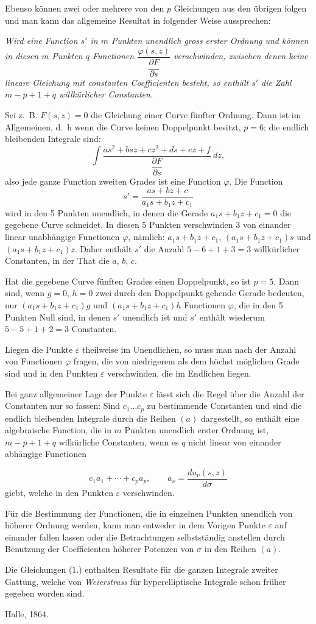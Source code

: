 \documentclass{article}
\begin{document}
Ebenso können zwei oder mehrere von den $p$ Gleichungen aus den übrigen folgen und man kann das allgemeine Resultat in folgender Weise aussprechen:

\emph{Wird eine Function $s'$ in $m$ Punkten unendlich gross erster Ordnung und können in diesen $m$ Punkten $q$ Functionen $\dfrac{\varphi(s, z)}{\dfrac{\partial F}{\partial s}}$ verschwinden, zwischen denen keine lineare Gleichung mit constanten Coefficienten besteht, so enthält $s'$ die Zahl $m-p+1+q$ willkürlicher Constanten.}

Sei z.~B. $F(s, z) = 0$ die Gleichung einer Curve fünfter Ordnung. Dann ist im Allgemeinen, d.~h wenn die Curve keinen Doppelpunkt besitzt, $p = 6$; die endlich bleibenden Integrale sind:
\[ \int \frac{as^{2} + bsz + cz^{2} + ds + ez + f}{\dfrac{\partial F}{\partial s}}\ dz, \]
also jede ganze Function zweiten Grades ist eine Function $\varphi$. Die Function
\[ s' = \frac{as + bz + c}{a_{1}s + b_{1}z + c_{1}} \]
wird in den 5 Punkten unendlich, in denen die Gerade $a_{1}s + b_{1}z + c_{1} = 0$ die gegebene Curve schneidet. In diesen 5 Punkten verschwinden 3 von einander linear unabhängige Functionen $\varphi$, nämlich: $a_{1}s + b_{1}z + c_{1}$, $(a_{1}s + b_{1}z + c_{1})s$ und $(a_{1}s + b_{1}z + c_{1})z$. Daher enthält $s'$ die Anzahl $5 - 6 + 1 + 3 = 3$ willkürlicher Constanten, in der That die $a$, $b$, $c$.

Hat die gegebene Curve fünften Grades einen Doppelpunkt, so ist $p = 5$. Dann sind, wenn $g = 0$, $h = 0$ zwei durch den Doppelpunkt gehende Gerade bedeuten, nur $(a_{1}s + b_{1}z + c_{1})g$ und $(a_{1}s + b_{1}z + c_{1})h$ Functionen $\varphi$, die in den 5 Punkten Null sind, in denen $s'$ unendlich ist und $s'$ enthält wiederum $5 - 5 + 1 + 2 = 3$ Constanten.

Liegen die Punkte $\varepsilon$ theilweise im Unendlichen, so muss man nach der Anzahl von Functionen $\varphi$ fragen, die von niedrigerem als dem höchst möglichen Grade sind und in den Punkten $\varepsilon$ verschwinden, die im Endlichen liegen.

Bei ganz allgemeiner Lage der Punkte $\varepsilon$ lässt sich die Regel über die Anzahl der Constanten nur so fassen: Sind $c_{1} \ldots c_{p}$ zu bestimmende Constanten und sind die endlich bleibenden Integrale durch die Reihen $(a)$ dargestellt, so enthält eine algebraische Function, die in $m$ Punkten unendlich erster Ordnung ist, $m-p+1+q$ wilkürliche Constanten, wenn es $q$ nicht linear von einander abhängige Functionen

\[ c_{1} a_{1} + \cdots + c_{p} a_{p}, \qquad a_{\nu} = \frac{du_{\nu}(s, z)}{d\sigma} \]
giebt, welche in den Punkten $\varepsilon$ verschwinden.

Für die Bestimmung der Functionen, die in einzelnen Punkten unendlich von höherer Ordnung werden, kann man entweder in dem Vorigen Punkte $\varepsilon$ auf einander fallen lassen oder die Betrachtungen selbstständig anstellen durch Benutzung der Coefficienten höherer Potenzen von $\sigma$ in den Reihen $(a)$.

Die Gleichungen (1.) enthalten Resultate für die ganzen Integrale zweiter Gattung, welche von \emph{Weierstrass} für hyperelliptische Integrale schon früher gegeben worden sind.

Halle, 1864.
\end{document}
